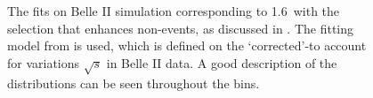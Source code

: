 \begin{figure}[htbp!]
{    }
    \caption{\label{fig:mbc_bbar_ehnhanced_fits_mc}
    The fits on Belle II simulation corresponding to 1.6~\invfb with the selection 
    that enhances non-\BtoXsgamma events, as discussed in .
    The fitting model from  is used,
    which is defined on the `corrected'-\Mbc to account for variations $\sqrt{s}$ in Belle II data.
    A good description of the \Mbc distributions can be seen throughout the \EB bins.
    }
\end{figure}

